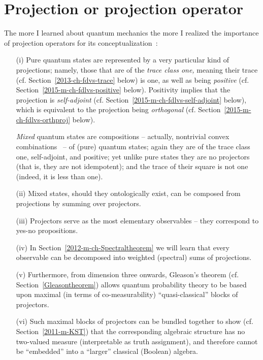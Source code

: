 \section{Projection or projection operator}
\label{2011-m-projec}


The more I learned about quantum mechanics the more
I realized the importance of projection operators for its conceptualization~\cite[-50mm]{v-neumann-49,birkhoff-36}:
\begin{itemize}
\item[(i)]
Pure quantum states
are represented by a very particular kind of projections;
namely, those that are of the {\em trace class one,} meaning their trace (cf. Section~\ref{2013-ch-fdvs-trace} below) is one,
as well as being {\em positive}
(cf. Section~\ref{2015-m-ch-fdlvs-positive} below).
Positivity implies
that the projection is {\em self-adjoint} (cf. Section~\ref{2015-m-ch-fdlvs-self-adjoint} below),
which is equivalent to the projection being {\em orthogonal}  (cf. Section~\ref{2015-m-ch-fdlvs-orthproj} below).

{\em Mixed} quantum states
are compositions -- actually, nontrivial convex combinations~ -- of (pure) quantum states; again they are of the trace class one, self-adjoint, and positive;
yet unlike pure states they are no projectors (that is, they are not idempotent);
and the trace of their square is not one (indeed, it is less than one).
\item[(ii)]
Mixed states, should they ontologically exist, can be composed from projections by summing over projectors.
\item[(iii)]
Projectors serve as the most elementary observables -- they correspond to yes-no propositions.
\item[(iv)]
In Section~\ref{2012-m-ch-Spectraltheorem} we will learn
that every observable can be decomposed into weighted (spectral) sums of projections.
\item[(v)]
Furthermore, from dimension three onwards, Gleason's theorem (cf. Section~\ref{Gleasontheorem}) allows
quantum probability theory to be based upon maximal (in terms of co-measurability) ``quasi-classical''
blocks of projectors.
\item[(vi)]
Such maximal blocks of projectors can be bundled together to show (cf. Section~\ref{2011-m-KST})
that the corresponding algebraic
structure has no two-valued measure (interpretable as truth assignment), and
therefore cannot be ``embedded'' into a ``larger'' classical (Boolean) algebra.
\end{itemize}



